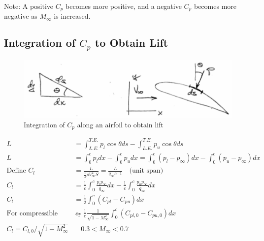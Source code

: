 \documentclass[draft=false, titlepage]{article}
\begin{document}
Note: A positive $C_p$ becomes more positive, and a negative $C_p$ becomes more negative as $M_\infty$ is increased.

\subsection{Integration of $C_p$ to Obtain Lift}
\begin{figure}[ht]
	\centering
	\includegraphics[width=0.7\linewidth]{Figures/p48_CpToLift.PNG}
	\caption{Integration of $C_p$ along an airfoil to obtain lift}
	\label{fig:p48_CpToLift}
\end{figure}

\begin{align*}
L &= \int_{L.E.}^{T.E.} p_l \cos\theta ds - \int_{L.E.}^{T.E.} p_u \cos\theta ds\\L &= \int_0^c p_l dx - \int_0^c p_u dx = \int_0^c (p_l-p_\infty)dx - \int_0^c(p_u-p_\infty)dx\\
\text{Define } C_l &= \frac{L}{\frac{1}{2}\rho V_\infty^2 S} = \frac{L}{q_\infty c\cdot 1} \quad \text{(unit span)}\\
	C_l &= \frac{1}{c}\int_0^c \frac{p_lp_\infty}{q_\infty}dx - \frac{1}{c}\int_0^c \frac{p_up_\infty}{q_\infty}dx\\
	C_l &= \frac{1}{2}\int_0^c(C_{pl}-C_{pu})dx\\
	\text{For compressible flow} \quad
	c_l &= \frac{1}{c} \frac{1}{\sqrt{1-M_\infty^2}}\int_0^c(C_{pl,0} - C_{pu,0})dx\\
	\boxed{C_l = C_{l,0}/\sqrt{1-M_\infty^2}} &\quad 0.3 < M_\infty < 0.7
\end{align*}
\end{document}

